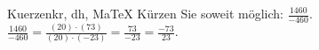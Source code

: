 \begin{MAufgabe}{Kuerzen}{kr, dh, MaTeX}
K\"urzen Sie soweit m\"oglich: $\frac{1460}{-460}$.\\ 
\ifLsg\MLoesung
\quad $\frac{1460}{-460}=\frac{(20)\cdot(73)}{(20)\cdot(-23)}=\frac{73}{-23}=\frac{-73}{23}$.\else\relax\fi
 \end{MAufgabe}